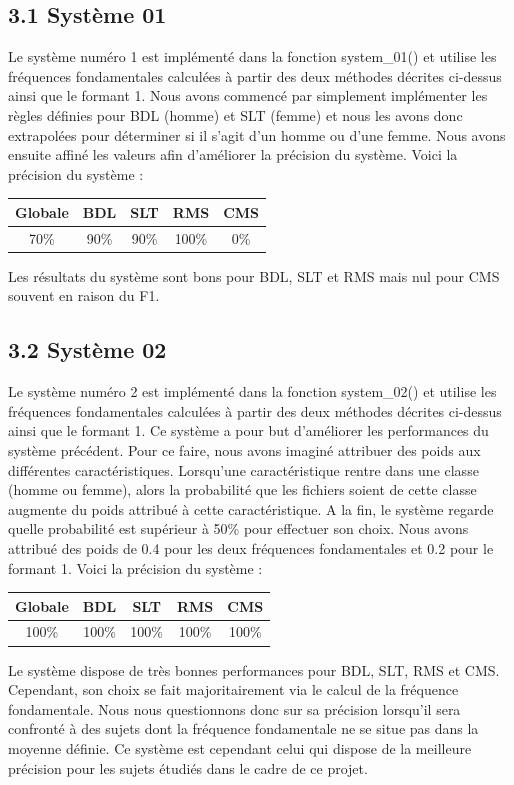 \documentclass[a4paper,12pt]{report}	%
\begin{document}
{\subsection*{3.1 Système 01}}
Le système numéro 1 est implémenté dans la fonction system\_01() et utilise les fréquences fondamentales calculées à partir des deux méthodes décrites ci-dessus ainsi que le formant 1. Nous avons commencé par simplement implémenter les règles définies pour BDL (homme) et SLT (femme) et nous les avons donc extrapolées pour déterminer si il s'agit d'un homme ou d'une femme. Nous avons ensuite affiné les valeurs afin d'améliorer la précision du système. Voici la précision du système : \\
\begin{center}
	\begin{tabular}{|c|c|c|c|c|}
		\hline
		Globale & BDL & SLT & RMS & CMS \\
		\hline
		70\% & 90\% & 90\% & 100\% & 0\% \\
		\hline
		\end{tabular}
\end{center}
Les résultats du système sont bons pour BDL, SLT et RMS mais nul pour CMS souvent en raison du F1.
{\subsection*{3.2 Système 02}}
Le système numéro 2 est implémenté dans la fonction system\_02() et utilise les fréquences fondamentales calculées à partir des deux méthodes décrites ci-dessus ainsi que le formant 1. Ce système a pour but d'améliorer les performances du système précédent. Pour ce faire, nous avons imaginé attribuer des poids aux différentes caractéristiques. Lorsqu'une caractéristique rentre dans une classe (homme ou femme), alors la probabilité que les fichiers soient de cette classe augmente du poids attribué à cette caractéristique. A la fin, le système regarde quelle probabilité est supérieur à 50\% pour effectuer son choix. Nous avons attribué des poids de 0.4 pour les deux fréquences fondamentales et 0.2 pour le formant 1. Voici la précision du système : \\
\begin{center}
	\begin{tabular}{|c|c|c|c|c|}
		\hline
		Globale & BDL & SLT & RMS & CMS \\
		\hline
		100\% & 100\% & 100\% & 100\% & 100\% \\
		\hline
	\end{tabular}
\end{center}
Le système dispose de très bonnes performances pour BDL, SLT, RMS et CMS. Cependant, son choix se fait majoritairement via le calcul de la fréquence fondamentale. Nous nous questionnons donc sur sa précision lorsqu'il sera confronté à des sujets dont la fréquence fondamentale ne se situe pas dans la moyenne définie. Ce système est cependant celui qui dispose de la meilleure précision pour les sujets étudiés dans le cadre de ce projet.
\end{document}

